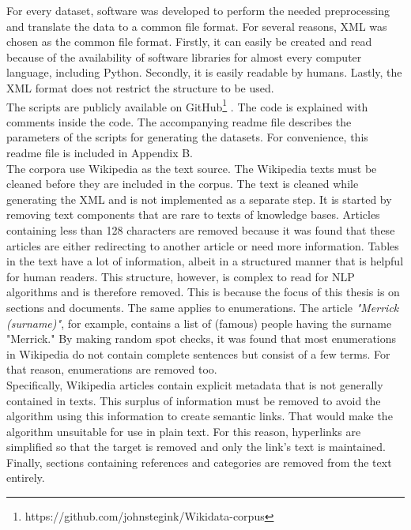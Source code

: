 For every dataset, software was developed to perform the needed preprocessing and translate the data to a common file format. For several reasons, XML was chosen as the common file format. Firstly, it can easily be created and read because of the availability of software libraries for almost every computer language, including Python. Secondly, it is easily readable by humans. Lastly, the XML format does not restrict the structure to be used. \\
The scripts are publicly available on GitHub\footnote{https://github.com/johnstegink/Wikidata-corpus} %
. The code is explained with comments inside the code. The accompanying readme file describes the parameters of the scripts for generating the datasets. For convenience, this readme file is included in Appendix B.\\

The corpora use Wikipedia as the text source. The Wikipedia texts must be cleaned before they are included in the corpus. The text is cleaned while generating the XML and is not implemented as a separate step. It is started by removing text components that are rare to texts of knowledge bases. Articles containing less than 128 characters are removed because it was found that these articles are either redirecting to another article or need more information. Tables in the text have a lot of information, albeit in a structured manner that is helpful for human readers. This structure, however, is complex to read for NLP algorithms and is therefore removed. This is because the focus of this thesis is on sections and documents. The same applies to enumerations. The article \textit{"Merrick (surname)"}, for example, contains a list of (famous) people having the surname "Merrick." By making random spot checks, it was found that most enumerations in Wikipedia do not contain complete sentences but consist of a few terms. For that reason, enumerations are removed too.\\

Specifically, Wikipedia articles contain explicit metadata that is not generally contained in texts. This surplus of information 
must be removed to avoid the algorithm using this information to create semantic links. That would make the algorithm unsuitable for use in plain text. For this reason, hyperlinks are simplified so that the target is removed and only the link's text is maintained. Finally, sections containing references and categories are removed from the text entirely.\\

